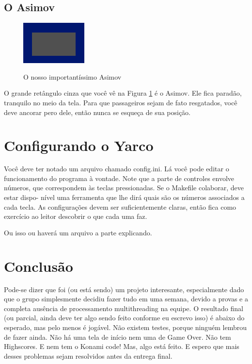 \documentclass[10pt,brazil]{article}
\begin{document}
\subsection{O Asimov}

\begin{figure}
\begin{center}
\includegraphics{ship}
\label{img:ship}
\caption{O nosso importantíssimo Asimov}
\end{center}
\end{figure}

O grande retângulo cinza que você vê na Figura \ref{img:ship} é o Asimov. Ele fica paradão, tranquilo no meio da tela.
Para que passageiros sejam de fato resgatados, você deve ancorar pero dele, então nunca se esqueça de sua posição.

\section{Configurando o Yarco}

Você deve ter notado um arquivo chamado config.ini. Lá você pode editar o funcionamento do programa à vontade. Note que
a parte de controles envolve números, que correspondem às teclas pressionadas. Se o Makefile colaborar, deve estar dispo-
nível uma ferramenta que lhe dirá quais são os números associados a cada tecla. As configurações devem ser suficientemente
claras, então fica como exercício ao leitor descobrir o que cada uma faz.

Ou isso ou haverá um arquivo a parte explicando.

\section{Conclusão}

Pode-se dizer que foi (ou está sendo) um projeto interesante, especialmente dado que o grupo simplesmente decidiu fazer tudo
em uma semana, devido a provas e a completa ausência de processamento multithreading na equipe. O resultado final (ou
parcial, ainda deve ter algo sendo feito conforme eu escrevo isso) é abaixo do esperado, mas pelo menos é jogável.
Não existem testes, porque ninguém lembrou de fazer ainda. Não há uma tela de início nem uma de Game Over. Não tem
Highscores. E nem tem o Konami code! Mas, algo está feito. E espero que mais desses problemas sejam resolvidos antes da
entrega final.
\end{document}
